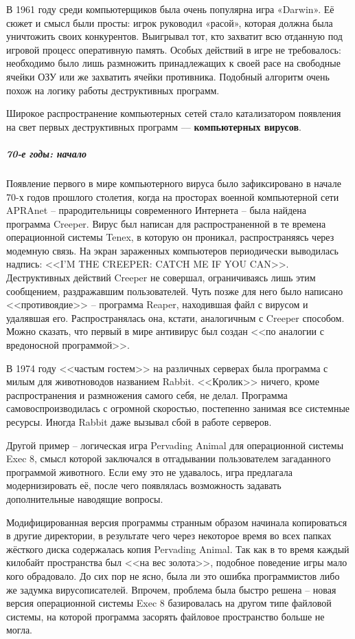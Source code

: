 В 1961 году среди компьютерщиков была очень популярна игра «Darwin». Её сюжет
и смысл были просты: игрок руководил «расой», которая должна была уничтожить
своих конкурентов. Выигрывал тот, кто захватит всю отданную под игровой
процесс оперативную память. Особых действий в игре не требовалось: необходимо
было лишь размножить принадлежащих к своей расе на свободные ячейки ОЗУ или
же захватить ячейки противника. Подобный алгоритм очень похож на логику
работы деструктивных программ.

Широкое распространение компьютерных сетей стало катализатором появления на
свет первых деструктивных программ –-- \textbf{компьютерных вирусов}.

\subparagraph{70-е годы: начало}
%
Появление первого в мире компьютерного вируса было зафиксировано в начале
70-х годов прошлого столетия, когда на просторах военной компьютерной сети
APRAnet – прародительницы современного Интернета – была найдена программа
Creeper. Вирус был написан для распространенной в те времена операционной
системы Tenex, в которую он проникал, распространяясь через модемную связь.
На экран зараженных компьютеров периодически выводилась надпись: <<I’M THE
CREEPER: CATCH ME IF YOU CAN>>. Деструктивных действий Creeper не совершал,
ограничиваясь лишь этим сообщением, раздражавшим пользователей. Чуть позже
для него было написано <<противоядие>> -- программа Reaper, находившая файл с
вирусом и удалявшая его. Распространялась она, кстати, аналогичным с Creeper
способом. Можно сказать, что первый в мире антивирус был создан <<по аналогии
с вредоносной программой>>.

В 1974 году <<частым гостем>> на различных серверах была программа с милым
для животноводов названием Rabbit. <<Кролик>> ничего, кроме распространения и
размножения самого себя, не делал. Программа самовоспроизводилась с огромной
скоростью, постепенно занимая все системные ресурсы. Иногда Rabbit даже
вызывал сбой в работе серверов.

Другой пример – логическая игра Pervading Animal для операционной системы
Exec 8, смысл которой заключался в отгадывании пользователем загаданного
программой животного. Если ему это не удавалось, игра предлагала
модернизировать её, после чего появлялась возможность задавать дополнительные
наводящие вопросы.

Модифицированная версия программы странным образом начинала копироваться в
другие директории, в результате чего через некоторое время во всех папках
жёсткого диска содержалась копия Pervading Animal. Так как в то время каждый
килобайт пространства был <<на вес золота>>, подобное поведение игры мало
кого обрадовало. До сих пор не ясно, была ли это ошибка программистов либо же
задумка вирусописателей. Впрочем, проблема была быстро решена – новая версия
операционной системы Exec 8 базировалась на другом типе файловой системы, на
которой программа засорять файловое пространство больше не могла.

